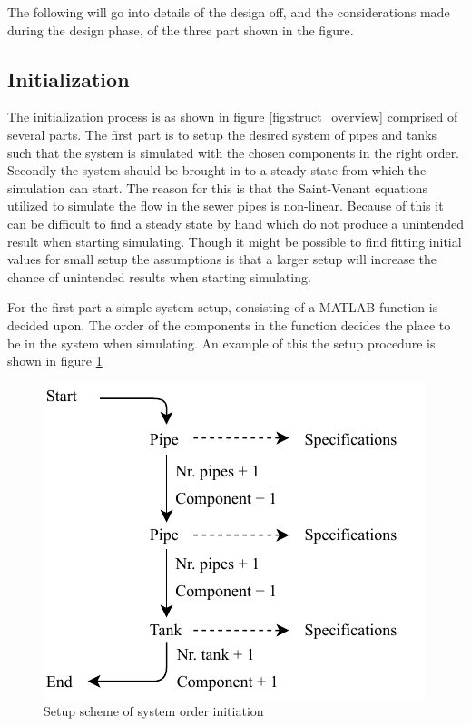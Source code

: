 The following will go into details of the design off, and the considerations made during the design phase, of the three part shown in the figure.

\subsection*{Initialization} 
The initialization process is as shown in figure \ref{fig:struct_overview} comprised of several parts. The first part is to setup the desired system of pipes and tanks such that the system is simulated with the chosen components in the right order.
Secondly the system should be brought in to a steady state from which the simulation can start.
The reason for this is that the Saint-Venant equations utilized to simulate the flow in the sewer pipes is non-linear. Because of this it can be difficult to find a steady state by hand which do not produce a unintended result when starting simulating. Though it might be possible to find fitting initial values for small setup the assumptions is that a larger setup will increase the chance of unintended results when starting simulating.

For the first part a simple system setup, consisting of a MATLAB function is decided upon. The order of the components in the function decides the place to be in the system when simulating. An example of this the setup procedure is shown in figure \ref{fig:sys_setup}  

\begin{figure}[H]
\centering
\includegraphics[width=0.55 \textwidth]{report/simulation/pictures/sys_setup.pdf}
\caption{Setup scheme of system order initiation}
\label{fig:sys_setup}
\end{figure}


